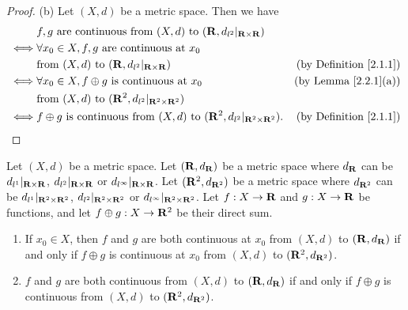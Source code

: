 \begin{proof}{(b)}
    Let \((X, d)\) be a metric space.
    Then we have
    \begin{align*}
             & f, g \text{ are continuous from } (X, d) \text{ to } (\mathbf{R}, d_{l^2}|_{\mathbf{R} \times \mathbf{R}})                                                  \\
        \iff & \forall x_0 \in X, f, g \text{ are continuous at } x_0                                                                              \\
             & \text{from } (X, d) \text{ to } (\mathbf{R}, d_{l^2}|_{\mathbf{R} \times \mathbf{R}})                                  & \text{(by Definition \ref{2.1.1})} \\
        \iff & \forall x_0 \in X, f \oplus g \text{ is continuous at } x_0                                    & \text{(by Lemma \ref{2.2.1}(a))}   \\
             & \text{from } (X, d) \text{ to } (\mathbf{R}^2, d_{l^2}|_{\mathbf{R}^2 \times \mathbf{R}^2})                                                                 \\
        \iff & f \oplus g \text{ is continuous from } (X, d) \text{ to } (\mathbf{R}^2, d_{l^2}|_{\mathbf{R}^2 \times \mathbf{R}^2}). & \text{(by Definition \ref{2.1.1})}
    \end{align*}
\end{proof}

\begin{additional corollary}\label{ac 2.2.1}
Let \((X, d)\) be a metric space.
Let \((\mathbf{R}, d_{\mathbf{R}})\) be a metric space where \(d_{\mathbf{R}}\) can be \(d_{l^1}|_{\mathbf{R} \times \mathbf{R}}\), \(d_{l^2}|_{\mathbf{R} \times \mathbf{R}}\) or \(d_{l^\infty}|_{\mathbf{R} \times \mathbf{R}}\).
Let \((\mathbf{R}^2, d_{\mathbf{R}^2})\) be a metric space where \(d_{\mathbf{R}^2}\) can be \(d_{l^1}|_{\mathbf{R}^2 \times \mathbf{R}^2}\), \(d_{l^2}|_{\mathbf{R}^2 \times \mathbf{R}^2}\) or \(d_{l^\infty}|_{\mathbf{R}^2 \times \mathbf{R}^2}\).
Let \(f : X \to \mathbf{R}\) and \(g : X \to \mathbf{R}\) be functions, and let \(f \oplus g : X \to \mathbf{R}^2\) be their direct sum.
\begin{enumerate}
    \item If \(x_0 \in X\), then \(f\) and \(g\) are both continuous at \(x_0\) from \((X, d)\) to \((\mathbf{R}, d_{\mathbf{R}})\) if and only if \(f \oplus g\) is continuous at \(x_0\) from \((X, d)\) to \((\mathbf{R}^2, d_{\mathbf{R}^2})\).
    \item \(f\) and \(g\) are both continuous from \((X, d)\) to \((\mathbf{R}, d_{\mathbf{R}})\) if and only if \(f \oplus g\) is continuous from \((X, d)\) to \((\mathbf{R}^2, d_{\mathbf{R}^2})\).
\end{enumerate}
\end{additional corollary}

